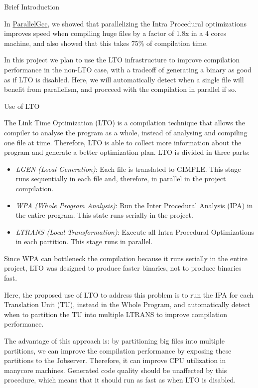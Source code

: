 \begin{section}{Brief Introduction}

In \href{https://gcc.gnu.org/wiki/ParallelGcc}{ParallelGcc}, we showed that parallelizing the Intra Procedural optimizations
improves speed when compiling huge files by a factor of 1.8x in a 4 cores
    machine, and also showed that this takes 75\% of compilation time.

In this project we plan to use the LTO infrastructure to improve
compilation performance in the non-LTO case, with a tradeoff of generating
a binary as good as if LTO is disabled. Here, we will automatically detect
when a single file will benefit from parallelism, and procceed with the
compilation in parallel if so.

\begin{section}{Use of LTO}

The Link Time Optimization (LTO) is a compilation technique that allows the
compiler to analyse the program as a whole, instead of analysing and compiling
one file at time. Therefore, LTO is able to collect more information about
the program and generate a better optimization plan. LTO is divided in three
parts:

\begin{itemize}
    \item \emph{LGEN (Local Generation)}: Each file is translated to GIMPLE. This
        stage runs sequentially in each file and, therefore, in parallel in
        the project compilation.

    \item \emph{WPA (Whole Program Analysis)}: Run the Inter Procedural Analysis (IPA) in the
        entire program. This state runs serially in the project.

    \item \emph{LTRANS (Local Transformation)}: Execute all Intra Procedural Optimizations in
        each partition. This stage runs in parallel.
\end{itemize}

Since WPA can bottleneck the compilation because it runs serially in the entire
project, LTO was designed to produce faster binaries, not to produce binaries
fast.

Here, the proposed use of LTO to address this problem is to run the IPA
for each Translation Unit (TU), instead in the Whole Program, and automatically
detect when to partition the TU into multiple LTRANS to improve compilation performance.

The advantage of this approach is: by partitioning big files into multiple
partitions, we can improve the compilation performance by exposing these
partitions to the Jobserver. Therefore, it can improve CPU utilization in
manycore machines.  Generated code quality should be unaffected by this
procedure, which means that it should run as fast as when LTO is disabled.




\end{section}
\end{section}
